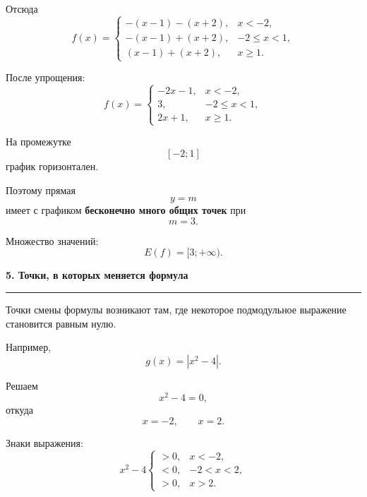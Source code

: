 \documentclass[a4paper,12pt]{article}
\newcommand{\lessonsection}[1]{%
    \vspace{0.6em}
    {\Large\bfseries\color{darkaccent}#1}\par
    \vspace{0.15em}
    {\color{softgray}\rule{\linewidth}{0.8pt}}
    \vspace{0.3em}
}
\begin{document}
Отсюда
\[
f(x)=
\begin{cases}
-(x-1)-(x+2), & x<-2,\\[1mm]
-(x-1)+(x+2), & -2\le x<1,\\[1mm]
(x-1)+(x+2), & x\ge 1.
\end{cases}
\]

После упрощения:
\[
\boxed{
f(x)=
\begin{cases}
-2x-1, & x<-2,\\[1mm]
3, & -2\le x<1,\\[1mm]
2x+1, & x\ge 1.
\end{cases}}
\]

\begin{center}
\end{center}

На промежутке
\[
[-2;1]
\]
график горизонтален.

Поэтому прямая
\[
y=m
\]
имеет с графиком \textbf{бесконечно много общих точек} при
\[
\boxed{m=3}.
\]

Множество значений:
\[
E(f)=[3;+\infty).
\]


\lessonsection{5. Точки, в которых меняется формула}

Точки смены формулы возникают там, где некоторое подмодульное выражение
становится равным нулю.

Например,
\[
g(x)=|x^2-4|.
\]

Решаем
\[
x^2-4=0,
\]
откуда
\[
x=-2,\qquad x=2.
\]

Знаки выражения:
\[
x^2-4
\begin{cases}
>0, & x<-2,\\
<0, & -2<x<2,\\
>0, & x>2.
\end{cases}
\]
\end{document}
